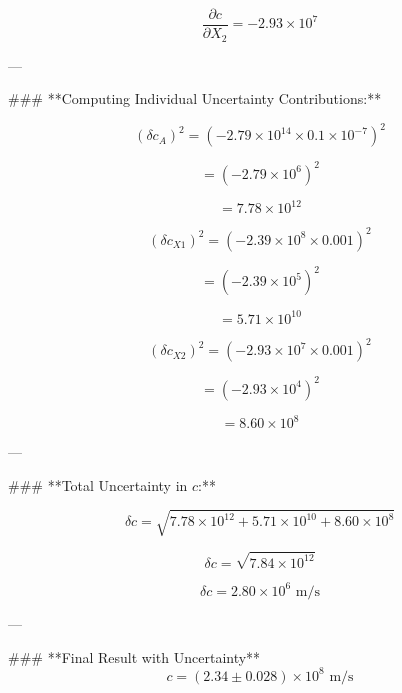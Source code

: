 \[
\frac{\partial c}{\partial X_2} = -2.93 \times 10^7
\]

---

### **Computing Individual Uncertainty Contributions:**

\[
(\delta c_A)^2 = (-2.79 \times 10^{14} \times 0.1 \times 10^{-7})^2
\]

\[
= ( -2.79 \times 10^6 )^2
\]

\[
= 7.78 \times 10^{12}
\]

\[
(\delta c_{X1})^2 = (-2.39 \times 10^8 \times 0.001)^2
\]

\[
= ( -2.39 \times 10^5 )^2
\]

\[
= 5.71 \times 10^{10}
\]

\[
(\delta c_{X2})^2 = (-2.93 \times 10^7 \times 0.001)^2
\]

\[
= ( -2.93 \times 10^4 )^2
\]

\[
= 8.60 \times 10^8
\]

---

### **Total Uncertainty in \( c \):**

\[
\delta c = \sqrt{ 7.78 \times 10^{12} + 5.71 \times 10^{10} + 8.60 \times 10^8 }
\]

\[
\delta c = \sqrt{7.84 \times 10^{12}}
\]

\[
\delta c = 2.80 \times 10^6 \text{ m/s}
\]

---

### **Final Result with Uncertainty**
\[
c = (2.34 \pm 0.028) \times 10^8 \text{ m/s}
\]
